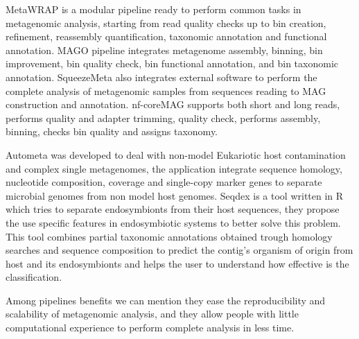 \documentclass{article}
\begin{document}

MetaWRAP is a modular pipeline ready to perform common tasks in metagenomic analysis, starting from read quality checks up to bin creation, refinement, reassembly quantification, taxonomic annotation and functional annotation.
MAGO pipeline integrates metagenome assembly, binning, bin improvement, bin quality check, bin functional annotation, and bin taxonomic annotation. 
SqueezeMeta also integrates external software to perform the complete analysis of metagenomic samples from sequences reading to MAG construction and annotation.%
nf-coreMAG supports both short and long reads, performs quality and adapter trimming, quality check,  performs assembly, binning, checks bin quality and assigns taxonomy.

Autometa was developed to deal with non-model Eukariotic host contamination and complex single metagenomes, the application integrate sequence homology, nucleotide composition, coverage and single-copy marker genes to separate microbial genomes from non model host genomes. 
Seqdex is a tool written in R which tries to separate endosymbionts from their host sequences, they propose the use specific features in endosymbiotic systems to better solve this problem. This tool combines partial taxonomic annotations obtained trough homology searches and sequence composition to predict the contig's organism of origin from host and its endosymbionts and helps the user to understand how effective is the classification.

Among pipelines benefits we can mention they ease the reproducibility and scalability of metagenomic analysis, and they allow people with little computational experience to perform complete analysis in less time.
\end{document}
